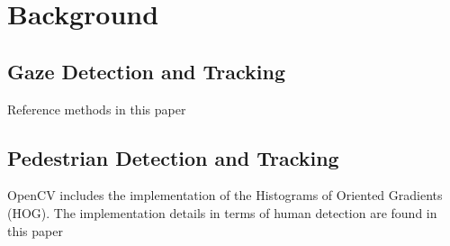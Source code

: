 \section{Background}
\subsection{Gaze Detection and Tracking}

Reference methods in this paper\cite{chennamma2013survey}

\subsection{Pedestrian Detection and Tracking}

OpenCV includes the implementation of the Histograms of Oriented Gradients (HOG).
The implementation details in terms of human detection are found in this paper\cite{1467360}